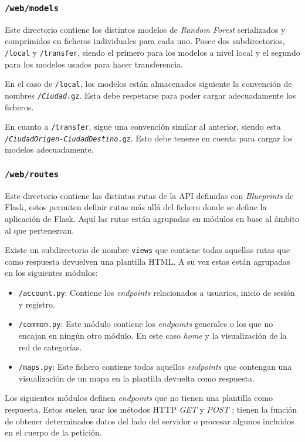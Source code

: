 \subsubsection{\texttt{/web/models}}
Este directorio contiene los distintos modelos de \textit{Random Forest} serializados y comprimidos en ficheros individuales para cada uno. Posee dos subdirectorios, \texttt{/local} y \texttt{/transfer}, siendo el primero para los modelos a nivel local y el segundo para los modelos usados para hacer transferencia.

En el caso de \texttt{/local}, los modelos están almacenados siguiente la convención de nombres \texttt{/\textit{Ciudad}.gz}. Esta debe respetarse para poder cargar adecuadamente los ficheros.

En cuanto a \texttt{/transfer}, sigue una convención similar al anterior, siendo esta \texttt{/\textit{CiudadOrigen}-\textit{CiudadDestino}.gz}. Esto debe tenerse en cuenta para cargar los modelos adecuadamente.

\subsubsection{\texttt{/web/routes}}
Este directorio contiene las distintas rutas de la API definidas con \textit{Blueprints} de Flask, estos permiten definir rutas más allá del fichero donde se define la aplicación de Flask. Aquí las rutas están agrupadas en módulos en base al ámbito al que pertenezcan.

Existe un subdirectorio de nombre \texttt{views} que contiene todas aquellas rutas que como respuesta devuelven una plantilla HTML. A su vez estas están agrupadas en los siguientes módulos:

\begin{itemize}
	\item \texttt{/account.py}: Contiene los \textit{endpoints} relacionados a usuarios, inicio de sesión y registro.
	\item \texttt{/common.py}: Este módulo contiene los \textit{endpoints} generales o los que no encajan en ningún otro módulo. En este caso \textit{home} y la visualización de la red de categorías.
	\item \texttt{/maps.py}: Este fichero contiene todos aquellos \textit{endpoints} que contengan una visualización de un mapa en la plantilla devuelta como respuesta.
\end{itemize}

Los siguientes módulos definen \textit{endpoints} que no tienen una plantilla como respuesta. Estos suelen usar los métodos HTTP \textit{GET} y \textit{POST} ; tienen la función de obtener determinados datos del lado del servidor o procesar algunos incluidos en el cuerpo de la petición.

